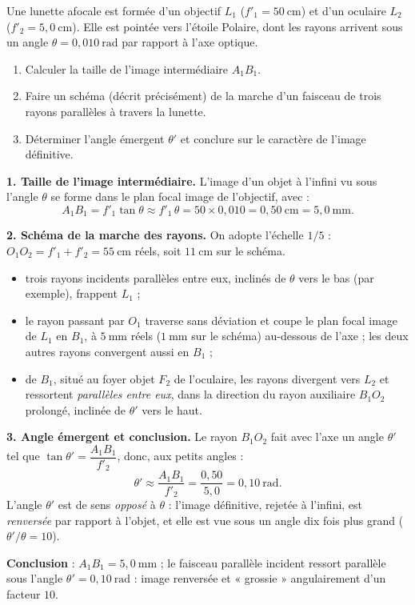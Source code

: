 \documentclass[11pt]{article}
\begin{document}
\begin{exoresolu}
Une lunette afocale est formée d'un objectif $L_1$ ($f'_1 = 50\ \text{cm}$) et d'un oculaire $L_2$ ($f'_2 = 5,0\ \text{cm}$). Elle est pointée vers l'étoile Polaire, dont les rayons arrivent sous un angle $\theta = 0,010\ \text{rad}$ par rapport à l'axe optique.
\begin{enumerate}
\item Calculer la taille de l'image intermédiaire $A_1B_1$.
\item Faire un schéma (décrit précisément) de la marche d'un faisceau de trois rayons parallèles à travers la lunette.
\item Déterminer l'angle émergent $\theta'$ et conclure sur le caractère de l'image définitive.
\end{enumerate}
\tcblower
\textbf{1. Taille de l'image intermédiaire.} L'image d'un objet à l'infini vu sous l'angle $\theta$ se forme dans le plan focal image de l'objectif, avec :
\[ A_1B_1 = f'_1 \tan\theta \approx f'_1\,\theta = 50 \times 0,010 = 0,50\ \text{cm} = 5,0\ \text{mm}. \]

\textbf{2. Schéma de la marche des rayons.} On adopte l'échelle $1/5$ : $O_1O_2 = f'_1 + f'_2 = 55\ \text{cm}$ réels, soit $11\ \text{cm}$ sur le schéma.
\begin{itemize}
\item trois rayons incidents parallèles entre eux, inclinés de $\theta$ vers le bas (par exemple), frappent $L_1$ ;
\item le rayon passant par $O_1$ traverse sans déviation et coupe le plan focal image de $L_1$ en $B_1$, à $5\ \text{mm}$ réels ($1\ \text{mm}$ sur le schéma) au-dessous de l'axe ; les deux autres rayons convergent aussi en $B_1$ ;
\item de $B_1$, situé au foyer objet $F_2$ de l'oculaire, les rayons divergent vers $L_2$ et ressortent \emph{parallèles entre eux}, dans la direction du rayon auxiliaire $B_1O_2$ prolongé, inclinée de $\theta'$ vers le haut.
\end{itemize}

\textbf{3. Angle émergent et conclusion.} Le rayon $B_1O_2$ fait avec l'axe un angle $\theta'$ tel que $\tan\theta' = \dfrac{A_1B_1}{f'_2}$, donc, aux petits angles :
\[ \theta' \approx \dfrac{A_1B_1}{f'_2} = \dfrac{0,50}{5,0} = 0,10\ \text{rad}. \]
L'angle $\theta'$ est de sens \emph{opposé} à $\theta$ : l'image définitive, rejetée à l'infini, est \emph{renversée} par rapport à l'objet, et elle est vue sous un angle dix fois plus grand ($\theta'/\theta = 10$).

\textbf{Conclusion} : $A_1B_1 = 5,0\ \text{mm}$ ; le faisceau parallèle incident ressort parallèle sous l'angle $\theta' = 0,10\ \text{rad}$ : image renversée et « grossie » angulairement d'un facteur $10$.
\end{exoresolu}
\end{document}
